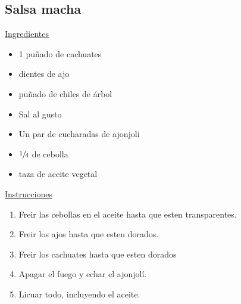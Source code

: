 \subsection{Salsa macha}

\underline{Ingredientes}
\begin{itemize}
\item 1 puñado de cachuates
\item {} dientes de ajo
\item {} puñado de chiles de árbol
\item \Sim Sal al gusto
\item Un par de cucharadas de ajonjoli
\item \Sim $\sfrac{1}{4}$ de cebolla
\item {} taza de aceite vegetal
\end{itemize}

\underline{Instrucciones}
\begin{enumerate}
\item Freir las cebollas en el aceite hasta que esten transparentes.
\item Freir los ajos hasta que esten dorados.
\item Freir los cachuates hasta que esten dorados
\item Apagar el fuego y echar el ajonjolí.
\item Licuar todo, incluyendo el aceite. 
\end{enumerate}
